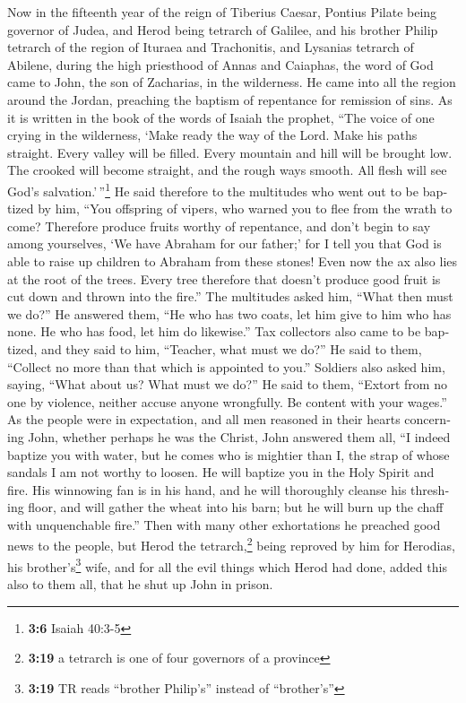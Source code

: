 \begin{paracol}{2}
\begin{otherlanguage}{english}
 Now in the fifteenth year of the reign of Tiberius
Caesar, Pontius Pilate being governor of Judea, and Herod being tetrarch
of Galilee, and his brother Philip tetrarch of the region of Ituraea and
Trachonitis, and Lysanias tetrarch of Abilene,  during the
high priesthood of Annas and Caiaphas, the word of God came to John, the
son of Zacharias, in the wilderness.  He came into all the
region around the Jordan, preaching the baptism of repentance for
remission of sins.  As it is written in the book of the
words of Isaiah the prophet, ``The voice of one crying in the
wilderness, `Make ready the way of the Lord. Make his paths straight.
 Every valley will be filled. Every mountain and hill will
be brought low. The crooked will become straight, and the rough ways
smooth.  All flesh will see God's
salvation.'\,''\footnote{\textbf{3:6} Isaiah 40:3-5}  He
said therefore to the multitudes who went out to be baptized by him,
``You offspring of vipers, who warned you to flee from the wrath to
come?  Therefore produce fruits worthy of repentance, and
don't begin to say among yourselves, `We have Abraham for our father;'
for I tell you that God is able to raise up children to Abraham from
these stones!  Even now the ax also lies at the root of
the trees. Every tree therefore that doesn't produce good fruit is cut
down and thrown into the fire.''  The multitudes asked
him, ``What then must we do?''  He answered them, ``He
who has two coats, let him give to him who has none. He who has food,
let him do likewise.''  Tax collectors also came to be
baptized, and they said to him, ``Teacher, what must we do?''
 He said to them, ``Collect no more than that which is
appointed to you.''  Soldiers also asked him, saying,
``What about us? What must we do?'' He said to them, ``Extort from no
one by violence, neither accuse anyone wrongfully. Be content with your
wages.''  As the people were in expectation, and all men
reasoned in their hearts concerning John, whether perhaps he was the
Christ,  John answered them all, ``I indeed baptize you
with water, but he comes who is mightier than I, the strap of whose
sandals I am not worthy to loosen. He will baptize you in the Holy
Spirit and fire.  His winnowing fan is in his hand, and
he will thoroughly cleanse his threshing floor, and will gather the
wheat into his barn; but he will burn up the chaff with unquenchable
fire.''  Then with many other exhortations he preached
good news to the people,  but Herod the
tetrarch,\footnote{\textbf{3:19} a tetrarch is one of four governors of
  a province} being reproved by him for Herodias, his
brother's\footnote{\textbf{3:19} TR reads ``brother Philip's'' instead
  of ``brother's''} wife, and for all the evil things which Herod had
done,  added this also to them all, that he shut up John
in prison.


\end{otherlanguage}
\end{paracol}

